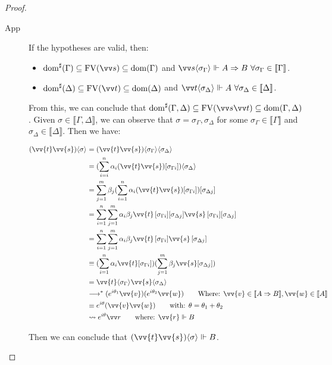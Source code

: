 \documentclass[runningheads,orivec,envcountsame,envcountsect]{llncs}
\newcommand\lra{\longrightarrow}
\newcommand\ansubst[2]{\ensuremath{\langle #1 \rangle_{#2}}}
\newcommand\dom[1]{\mathrm{dom}(#1)}
\newcommand\sdom[1]{\mathrm{dom}^{\sharp}(#1)}
\newcommand\FV[1]{\mathrm{FV}(#1)}
\def\lraneq{\rightsquigarrow}
\def\eval{\lra^*}
\def\Arr{\Rightarrow}
\def\sem#1{\llbracket#1\rrbracket}
\def\real{\Vdash}
\begin{document}
\begin{proof}
\begin{description}
    \item[App] If the hypotheses are valid, then:
    \begin{itemize}
        \item $\sdom{\Gamma}\subseteq \FV{\vv s}\subseteq \dom{\Gamma}$ and $\vv s \ansubst{\sigma_\Gamma}{}\Vdash A\Arr B\ \forall \sigma_\Gamma\in\sem{\Gamma}$.
        \item $\sdom{\Delta}\subseteq \FV{\vv t}\subseteq \dom{\Delta}$ and $\vv t\ansubst{\sigma_\Delta}{}\Vdash A\ \forall\sigma_\Delta\in\sem{\Delta}$.
    \end{itemize}
    
    From this, we can conclude that $\sdom{\Gamma,\Delta}\subseteq \FV{\vv s \vv t}\subseteq \dom{\Gamma,\Delta}$. Given $\sigma\in\sem{\Gamma,\Delta}$, we can observe that $\sigma=\sigma_\Gamma,\sigma_\Delta$ for some $\sigma_\Gamma\in\sem{\Gamma}$ and $\sigma_\Delta\in\sem{\Delta}$. Then we have:
    
    \begin{align*}
        (\vv{t}\vv{s})\ansubst{\sigma}{} &= (\vv{t}\vv{s})\ansubst{\sigma_\Gamma}{}\ansubst{\sigma_\Delta}{}\\
        &=(\sum_{i=i}^{n}\alpha_i (\vv{t}\vv{s})[\sigma_{\Gamma i}])\ansubst{\sigma_\Delta}{}\\
        &=\sum_{j=1}^{m} \beta_j (\sum_{i=1}^{n} \alpha_i (\vv{t} \vv{s})[\sigma_{\Gamma i}])[\sigma_{\Delta j}]\\
        &=\sum_{i=1}^{n}\sum_{j=1}^{m} \alpha_i \beta_j \vv{t}\,[\sigma_{\Gamma i}][\sigma_{\Delta j}] \vv{s}\,[\sigma_{\Gamma i}][\sigma_{\Delta j}]\\
        &=\sum_{i=1}^{n}\sum_{j=1}^{m} \alpha_i \beta_j \vv{t}\,[\sigma_{\Gamma i}]\vv{s}\,[\sigma_{\Delta j}]\\
        &\equiv (\sum_{i=1}^{n}\alpha_i\vv{t}[\sigma_{\Gamma i}])(\sum_{j=1}^{m} \beta_j \vv{s}[\sigma_{\Delta j}])\\
        &=\vv{t}\ansubst{\sigma_\Gamma}{} \vv{s}\ansubst{\sigma_\Delta}{}\\
        &\eval (e^{i\theta_{1}} \vv{v}) (e^{i\theta_{2}} \vv{w})\qquad\text{Where: } \vv{v}\in\sem{A\Arr B}, \vv{w}\in\sem{A}\\
        &\equiv e^{i\theta} (\vv{v} \vv{w})\qquad\text{with: }\theta=\theta_1 + \theta_2\\
        &\lraneq e^{i\theta}\vv r\qquad\text{where: } \vv{r}\real B
    \end{align*}
    
    Then we can conclude that $(\vv{t}\vv{s})\ansubst{\sigma}{}\real B$.


\end{description}
\end{proof}
\end{document}
